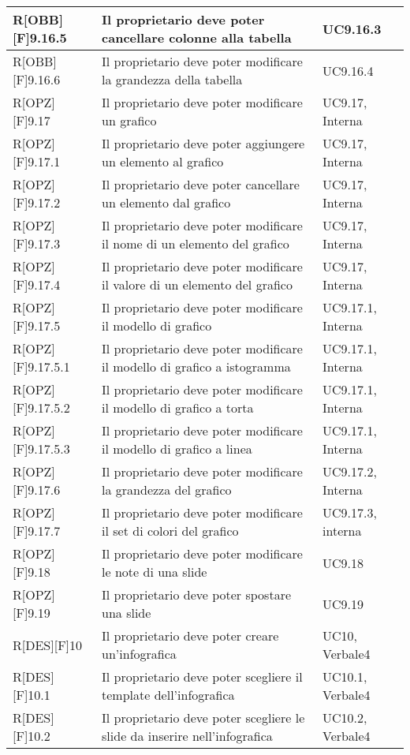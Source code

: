	\begin{table}[h]
		\begin{tabular}{|p{}|p{}|p{}|}
			\midrule
			R[OBB][F]9.16.5 & Il proprietario deve poter cancellare colonne alla tabella & UC9.16.3 \\ \midrule
			R[OBB][F]9.16.6 & Il proprietario deve poter modificare la grandezza della tabella & UC9.16.4 \\ \midrule
			R[OPZ][F]9.17 & Il proprietario deve poter modificare un grafico & UC9.17, Interna \\ \midrule
			R[OPZ][F]9.17.1 & Il proprietario deve poter aggiungere un elemento al grafico & UC9.17, Interna \\ \midrule
			R[OPZ][F]9.17.2 & Il proprietario deve poter cancellare un elemento dal grafico & UC9.17, Interna \\ \midrule
			R[OPZ][F]9.17.3 & Il proprietario deve poter modificare il nome di un elemento del grafico & UC9.17, Interna \\ \midrule
			R[OPZ][F]9.17.4 & Il proprietario deve poter modificare il valore di un elemento del grafico & UC9.17, Interna \\ \midrule
			R[OPZ][F]9.17.5 & Il proprietario deve poter modificare il modello di grafico & UC9.17.1, Interna \\ \midrule
			R[OPZ][F]9.17.5.1 & Il proprietario deve poter modificare il modello di grafico a istogramma & UC9.17.1, Interna \\ \midrule
			R[OPZ][F]9.17.5.2 & Il proprietario deve poter modificare il modello di grafico a torta & UC9.17.1, Interna \\ \midrule
			R[OPZ][F]9.17.5.3 & Il proprietario deve poter modificare il modello di grafico a linea & UC9.17.1, Interna \\ \midrule
			R[OPZ][F]9.17.6 & Il proprietario deve poter modificare la grandezza del grafico & UC9.17.2, Interna \\ \midrule
			R[OPZ][F]9.17.7 & Il proprietario deve poter modificare il set di colori del grafico & UC9.17.3, interna \\ \midrule
			R[OPZ][F]9.18 & Il proprietario deve poter modificare le note di una slide & UC9.18 \\ \midrule
			R[OPZ][F]9.19 & Il proprietario deve poter spostare una slide & UC9.19 \\ \midrule
			R[DES][F]10 & Il proprietario deve poter creare un'\gls{infografica} & UC10, Verbale4 \\ \midrule
			R[DES][F]10.1 & Il proprietario deve poter scegliere il \gls{template} dell'\gls{infografica} & UC10.1, Verbale4 \\ \midrule
			R[DES][F]10.2 & Il proprietario deve poter scegliere le \gls{slide} da inserire nell'\gls{infografica} & UC10.2, Verbale4 \\ \midrule

	\end{tabular}
	\end{table}
	\newpage
	
